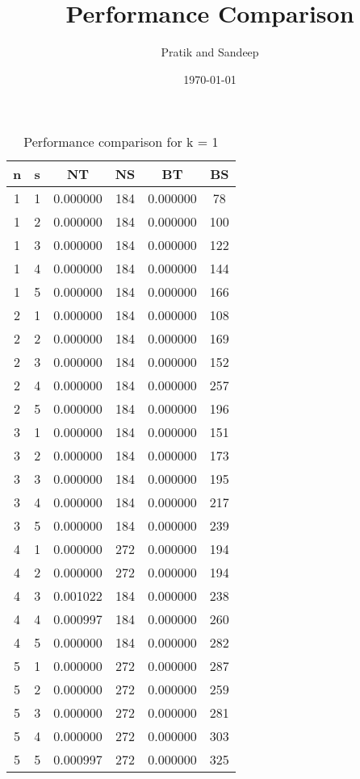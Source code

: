 \documentclass{article}
\begin{document}
    \title{Performance Comparison}
    \author{Pratik and Sandeep}
    \date{\today}
    \maketitle
    
    \begin{table}[ht]
    \centering
    \begin{tabular}{|c|c|c|c|c|c|}
    \hline
    n & s & NT & NS & BT & BS \\
    \hline
     1 & 1 & 0.000000 & 184 & 0.000000 & 78 \\ 
 1 & 2 & 0.000000 & 184 & 0.000000 & 100 \\ 
 1 & 3 & 0.000000 & 184 & 0.000000 & 122 \\ 
 1 & 4 & 0.000000 & 184 & 0.000000 & 144 \\ 
 1 & 5 & 0.000000 & 184 & 0.000000 & 166 \\ 
 2 & 1 & 0.000000 & 184 & 0.000000 & 108 \\ 
 2 & 2 & 0.000000 & 184 & 0.000000 & 169 \\ 
 2 & 3 & 0.000000 & 184 & 0.000000 & 152 \\ 
 2 & 4 & 0.000000 & 184 & 0.000000 & 257 \\ 
 2 & 5 & 0.000000 & 184 & 0.000000 & 196 \\ 
 3 & 1 & 0.000000 & 184 & 0.000000 & 151 \\ 
 3 & 2 & 0.000000 & 184 & 0.000000 & 173 \\ 
 3 & 3 & 0.000000 & 184 & 0.000000 & 195 \\ 
 3 & 4 & 0.000000 & 184 & 0.000000 & 217 \\ 
 3 & 5 & 0.000000 & 184 & 0.000000 & 239 \\ 
 4 & 1 & 0.000000 & 272 & 0.000000 & 194 \\ 
 4 & 2 & 0.000000 & 272 & 0.000000 & 194 \\ 
 4 & 3 & 0.001022 & 184 & 0.000000 & 238 \\ 
 4 & 4 & 0.000997 & 184 & 0.000000 & 260 \\ 
 4 & 5 & 0.000000 & 184 & 0.000000 & 282 \\ 
 5 & 1 & 0.000000 & 272 & 0.000000 & 287 \\ 
 5 & 2 & 0.000000 & 272 & 0.000000 & 259 \\ 
 5 & 3 & 0.000000 & 272 & 0.000000 & 281 \\ 
 5 & 4 & 0.000000 & 272 & 0.000000 & 303 \\ 
 5 & 5 & 0.000997 & 272 & 0.000000 & 325 \\ 

    \hline
    \end{tabular}
    \caption{Performance comparison for k = 1}
    \end{table}
    
\end{document}
